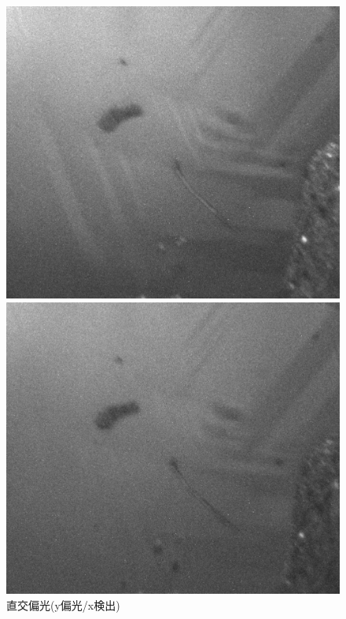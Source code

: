 \documentclass[11pt,a4paper]{jsarticle}
\begin{document}
\begin{figure}[htbp]
 \begin{minipage}{0.333\hsize}
  \begin{center}
   \includegraphics[width=\hsize]{vh250.eps}
  \end{center}
  \caption{直交偏光(y偏光/x検出)}
  \label{fig:vh250}
 \end{minipage}
 \begin{minipage}{0.333\hsize}
  \begin{center}
   \includegraphics[width=\hsize]{hv250.eps}

\end{center}
\end{minipage}
\end{figure}
\end{document}
